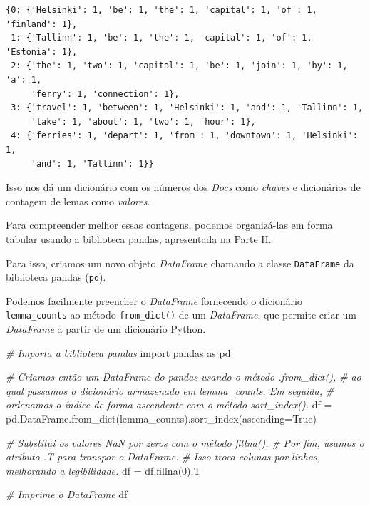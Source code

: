 \documentclass[
  brazilian,
]{article}
\newenvironment{Shaded}{}{}
\newcommand{\CommentTok}[1]{\textcolor[rgb]{0.38,0.63,0.69}{\textit{#1}}}
\newcommand{\DecValTok}[1]{\textcolor[rgb]{0.25,0.63,0.44}{#1}}
\newcommand{\ImportTok}[1]{#1}
\newcommand{\NormalTok}[1]{#1}
\newcommand{\OperatorTok}[1]{\textcolor[rgb]{0.40,0.40,0.40}{#1}}
\newcommand{\VariableTok}[1]{\textcolor[rgb]{0.10,0.09,0.49}{#1}}
\begin{document}
\begin{verbatim}
{0: {'Helsinki': 1, 'be': 1, 'the': 1, 'capital': 1, 'of': 1, 'finland': 1},
 1: {'Tallinn': 1, 'be': 1, 'the': 1, 'capital': 1, 'of': 1, 'Estonia': 1},
 2: {'the': 1, 'two': 1, 'capital': 1, 'be': 1, 'join': 1, 'by': 1, 'a': 1,
     'ferry': 1, 'connection': 1},
 3: {'travel': 1, 'between': 1, 'Helsinki': 1, 'and': 1, 'Tallinn': 1,
     'take': 1, 'about': 1, 'two': 1, 'hour': 1},
 4: {'ferries': 1, 'depart': 1, 'from': 1, 'downtown': 1, 'Helsinki': 1,
     'and': 1, 'Tallinn': 1}}
\end{verbatim}

Isso nos dá um dicionário com os números dos \emph{Docs} como
\emph{chaves} e dicionários de contagem de lemas como \emph{valores}.

Para compreender melhor essas contagens, podemos organizá-las em forma
tabular usando a biblioteca pandas, apresentada na Parte II.

Para isso, criamos um novo objeto \emph{DataFrame} chamando a classe
\texttt{DataFrame} da biblioteca pandas (\texttt{pd}).

Podemos facilmente preencher o \emph{DataFrame} fornecendo o dicionário
\texttt{lemma\_counts} ao método \texttt{from\_dict()} de um
\emph{DataFrame}, que permite criar um \emph{DataFrame} a partir de um
dicionário Python.

\begin{Shaded}
\begin{Highlighting}[]
\CommentTok{\# Importa a biblioteca pandas}
\ImportTok{import}\NormalTok{ pandas }\ImportTok{as}\NormalTok{ pd}

\CommentTok{\# Criamos então um DataFrame do pandas usando o método .from\_dict(),}
\CommentTok{\# ao qual passamos o dicionário armazenado em \textquotesingle{}lemma\_counts\textquotesingle{}. Em seguida,}
\CommentTok{\# ordenamos o índice de forma ascendente com o método sort\_index().}
\NormalTok{df }\OperatorTok{=}\NormalTok{ pd.DataFrame.from\_dict(lemma\_counts).sort\_index(ascending}\OperatorTok{=}\VariableTok{True}\NormalTok{)}

\CommentTok{\# Substitui os valores NaN por zeros com o método fillna().}
\CommentTok{\# Por fim, usamos o atributo .T para transpor o DataFrame.}
\CommentTok{\# Isso troca colunas por linhas, melhorando a legibilidade.}
\NormalTok{df }\OperatorTok{=}\NormalTok{ df.fillna(}\DecValTok{0}\NormalTok{).T}

\CommentTok{\# Imprime o DataFrame}
\NormalTok{df}
\end{Highlighting}
\end{Shaded}
\end{document}
